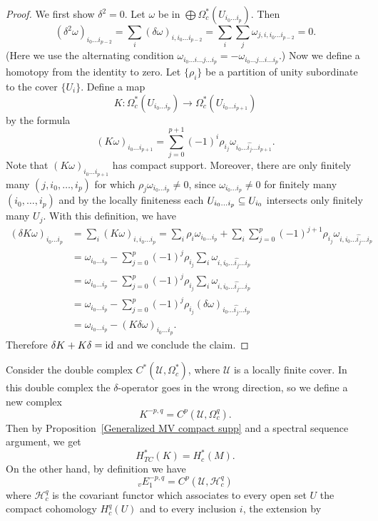 \begin{proof}
We first show $\delta^2=0$. Let $\omega$ be in $\bigoplus\Omega^*_c(U_{i_0\dots i_p})$. Then
\[(\delta^2\omega)_{i_0\dots i_{p-2}}=\sum_i(\delta\omega)_{i,i_0\dots i_{p-2}}=\sum_i\sum_j\omega_{j,i,i_0\dots i_{p-2}}=0.\]
(Here we use the alternating condition $\omega_{i_0\dots i\dots j\dots i_p}=-\omega_{i_0\dots j\dots i\dots i_p}$.) Now we define a homotopy from the identity to zero. 
Let $\{\rho_i\}$ be a partition of unity subordinate to the cover $\{U_i\}$. Define a map
\[K:\Omega^*_c(U_{i_0\dots i_p})\to\Omega^*_c(U_{i_0\dots i_{p+1}})\]
by the formula
\[(K\omega)_{i_0\dots i_{p+1}}=\sum_{j=0}^{p+1}(-1)^i\rho_{i_j}\omega_{i_0\dots\widehat{i_j}\dots i_{p+1}}.\]
Note that $(K\omega)_{i_0\dots i_{p+1}}$ has compact support. Moreover, there are only finitely many $(j,i_0,\dots,i_p)$ for which $\rho_j\omega_{i_0\dots i_p}\neq 0$, 
since $\omega_{i_0\dots i_p}\neq 0$ for finitely many $(i_0,\dots,i_p)$ and by the locally finiteness each $U_{i_0\dots i_p}\subseteq U_{i_0}$ intersects only finitely many 
$U_j$. With this definition, we have
\begin{align*}
(\delta K\omega)_{i_0\dots i_p}&=\sum_i(K\omega)_{i,i_0\dots i_{p}}=\sum_i\rho_{i}\omega_{i_0\dots i_{p}}+\sum_i\sum_{j=0}^{p}(-1)^{j+1}\rho_{i_j}\omega_{i,i_0\dots\widehat{i_{j}}\dots i_{p}}\\
&=\omega_{i_0\dots i_p}-\sum_{j=0}^{p}(-1)^j\rho_{i_j}\sum_i\omega_{i,i_0\dots\widehat{i_{j}}\dots i_{p}}\\
&=\omega_{i_0\dots i_p}-\sum_{j=0}^{p}(-1)^j\rho_{i_j}\sum_i\omega_{i,i_0\dots\widehat{i_{j}}\dots i_{p}}\\
&=\omega_{i_0\dots i_p}-\sum_{j=0}^{p}(-1)^j\rho_{i_j}(\delta\omega)_{i_0\dots\widehat{i_{j}}\dots i_{p}}\\
&=\omega_{i_0\dots i_p}-(K\delta\omega)_{i_0\dots i_p}.
\end{align*}
Therefore $\delta K+K\delta=\mathrm{id}$ and we conclude the claim.
\end{proof}
Consider the double complex $C^*(\mathcal{U},\Omega^*_c)$, where $\mathcal{U}$ is a locally finite cover. In this double complex the $\delta$-operator goes in the wrong 
direction, so we define a new complex
\[K^{-p,q}=C^p(\mathcal{U},\Omega^q_c).\]
Then by Proposition~\ref{Generalized MV compact supp} and a spectral sequence argument, we get
\[H_{TC}^*(K)=H_c^*(M).\]
On the other hand, by definition we have
\[_{v}E_1^{-p,q}=C^p(\mathcal{U},\mathscr{H}_c^q)\]
where $\mathscr{H}_c^q$ is the covariant functor which associates to every open set $U$ the compact cohomology $H^q_c(U)$ and to every inclusion $i$, the extension by 
